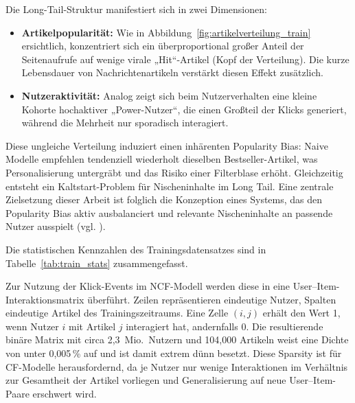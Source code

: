 Die Long-Tail-Struktur manifestiert sich in zwei Dimensionen:
\begin{itemize}
    \item \textbf{Artikelpopularität:} Wie in Abbildung~\ref{fig:artikelverteilung_train} ersichtlich, 
    konzentriert sich ein \newline überproportional großer Anteil der Seitenaufrufe auf wenige virale „Hit“-Artikel 
    (Kopf der Verteilung). Die kurze Lebensdauer von Nachrichtenartikeln verstärkt diesen Effekt zusätzlich.
    \item \textbf{Nutzeraktivität:} Analog zeigt sich beim Nutzerverhalten eine kleine Kohorte hochaktiver 
    „Power-Nutzer“, die einen Großteil der Klicks generiert, während die Mehrheit nur sporadisch interagiert.
\end{itemize}
Diese ungleiche Verteilung induziert einen inhärenten Popularity Bias: Naive Modelle empfehlen tendenziell 
wiederholt dieselben Bestseller-Artikel, was Personalisierung untergräbt und das Risiko einer Filterblase erhöht. 
Gleichzeitig entsteht ein Kaltstart-Problem für Nischeninhalte im Long Tail. Eine zentrale Zielsetzung 
dieser Arbeit ist folglich die Konzeption eines Systems, das den Popularity Bias aktiv ausbalanciert und 
relevante Nischeninhalte an passende Nutzer ausspielt (vgl. \cite{Abdollahpouri_Popularity_Bias_2019}).


Die statistischen Kennzahlen des Trainingsdatensatzes sind in Tabelle~\ref{tab:train_stats} zusammengefasst.

\label{tab:train_stats}

Zur Nutzung der Klick-Events im \ac{NCF}-Modell werden diese in eine \newline User–Item-Interaktionsmatrix überführt. 
Zeilen repräsentieren eindeutige Nutzer, Spalten eindeutige Artikel des Trainingszeitraums. 
Eine Zelle $(i,j)$ erhält den Wert 1, wenn Nutzer $i$ mit Artikel $j$ interagiert hat, andernfalls 0. 
Die resultierende binäre Matrix mit circa 2{,}3~Mio.\ Nutzern und 104{,}000 Artikeln weist eine Dichte 
von unter 0{,}005\,\% auf und ist damit extrem dünn besetzt. Diese Sparsity ist für \ac{CF}-Modelle herausfordernd, 
da je Nutzer nur wenige Interaktionen im Verhältnis zur Gesamtheit der Artikel vorliegen und Generalisierung auf 
neue User–Item-Paare erschwert wird.


